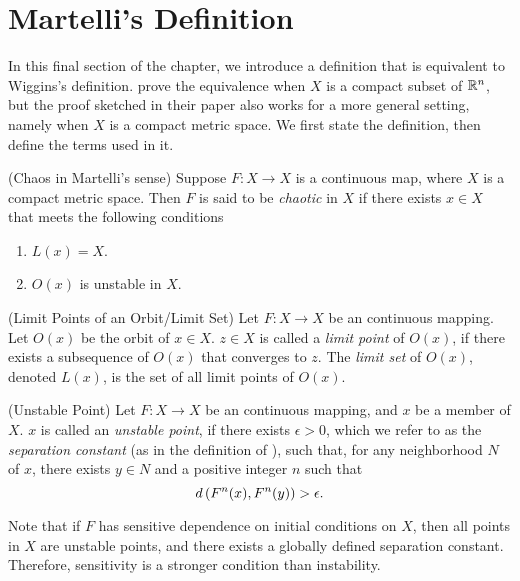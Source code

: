 \documentclass[10pt,draft,twoside]{book}
\begin{document}
\section{Martelli's Definition}
In this final section of the chapter, we introduce a definition that is equivalent to Wiggins's definition.
\citet{martelli} prove the equivalence when $X$ is a compact subset of $\mathbb{R}^n$, but the proof sketched in their paper also works for a more general setting, namely when $X$ is a compact metric space.
We first state the definition, then define the terms used in it.
\begin{definition}
  (Chaos in Martelli's sense)
  Suppose $F: X \to X$ is a continuous map, where $X$ is a compact metric space.
  Then $F$ is said to be \textit{chaotic} in $X$ if there exists $x \in X$ that meets the following conditions
  \begin{enumerate}
    \item $L(x) = X$.
    \item $O(x)$ is unstable in $X$.
  \end{enumerate}
  \label{defn:martelli}
\end{definition}
\begin{definition}
  (Limit Points of an Orbit/Limit Set)
  Let $F: X\to X$ be an continuous mapping.
  Let $O(x)$ be the orbit of $x \in X$.
  $z \in X$ is called a \textit{limit point} of $O(x)$, if there exists a subsequence of $O(x)$ that converges to $z$.
  The \textit{limit set} of $O(x)$, denoted $L(x)$, is the set of all limit points of $O(x)$.
  \label{def:limset}
\end{definition}
\begin{definition}
  (Unstable Point)
  Let $F: X\to X$ be an continuous mapping, and $x$ be a member of $X$.
  $x$ is called an \textit{unstable point}, if there exists $\epsilon > 0$, which we refer to as the \textit{separation constant} (as in the definition of \sdic), such that, for any neighborhood $N$ of $x$, there exists $y \in N$ and a positive integer $n$ such that 
  \begin{equation*}
    d\left( F^{n}(x), F^{n}(y) \right) > \epsilon.
  \end{equation*}
  \label{defn:unstable-orbit}
\end{definition}
Note that if $F$ has sensitive dependence on initial conditions on $X$, then all points in $X$ are unstable points, and there exists a globally defined separation constant.
Therefore, sensitivity is a stronger condition than instability.
\end{document}
